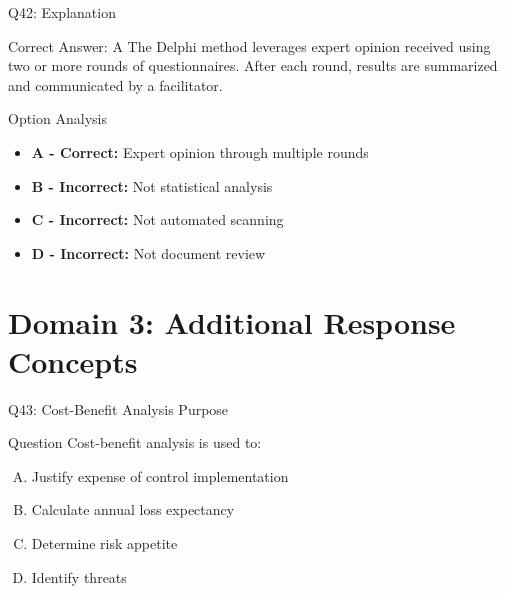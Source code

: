 \documentclass{beamer}
\begin{document}
	\begin{frame}{Q42: Explanation}
		\begin{block}{Correct Answer: A}
			The Delphi method leverages expert opinion received using two or more rounds of questionnaires. After each round, results are summarized and communicated by a facilitator.
		\end{block}
		\begin{block}{Option Analysis}
			\begin{itemize}
				\item \textbf{A - Correct:} Expert opinion through multiple rounds
				\item \textbf{B - Incorrect:} Not statistical analysis
				\item \textbf{C - Incorrect:} Not automated scanning
				\item \textbf{D - Incorrect:} Not document review
			\end{itemize}
		\end{block}
	\end{frame}
	
	
	\section{Domain 3: Additional Response Concepts}
	
	\begin{frame}{Q43: Cost-Benefit Analysis Purpose}
		\begin{block}{Question}
			Cost-benefit analysis is used to:
		\end{block}
		\begin{enumerate}[(A)]
			\item Justify expense of control implementation
			\item Calculate annual loss expectancy
			\item Determine risk appetite
			\item Identify threats
		\end{enumerate}
	\end{frame}
	
\end{document}
